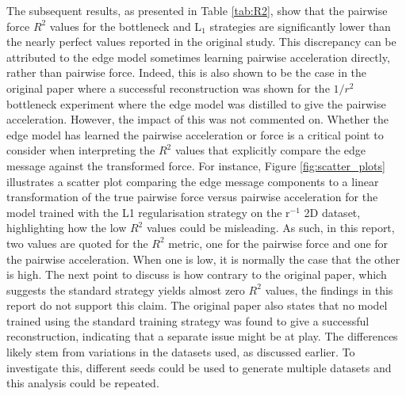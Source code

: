 \documentclass[11pt]{article}
\begin{document}
The subsequent results, as presented in Table \ref{tab:R2}, show that the pairwise force $R^2$ values for the bottleneck and L$_1$ strategies are significantly lower than the nearly perfect values reported in the original study. This discrepancy can be attributed to the edge model sometimes learning pairwise acceleration directly, rather than pairwise force. Indeed, this is also shown to be the case in the original paper where a successful reconstruction was shown for the $1/r^2$ bottleneck experiment where the edge model was distilled to give the pairwise acceleration. However, the impact of this was not commented on. Whether the edge model has learned the pairwise acceleration or force is a critical point to consider when interpreting the $R^2$ values that explicitly compare the edge message against the transformed force. For instance, Figure \ref{fig:scatter_plots} illustrates a scatter plot comparing the edge message components to a linear transformation of the true pairwise force versus pairwise acceleration for the model trained with the L1 regularisation strategy on the r$^{-1}$ 2D dataset, highlighting how the low $R^2$ values could be misleading. As such, in this report, two values are quoted for the $R^2$ metric, one for the pairwise force and one for the pairwise acceleration. When one is low, it is normally the case that the other is high. The next point to discuss is how contrary to the original paper, which suggests the standard strategy yields almost zero $R^2$ values, the findings in this report do not support this claim. The original paper also states that no model trained using the standard training strategy was found to give a successful reconstruction, indicating that a separate issue might be at play. The differences likely stem from variations in the datasets used, as discussed earlier. To investigate this, different seeds could be used to generate multiple datasets and this analysis could be repeated. 

\end{document}
